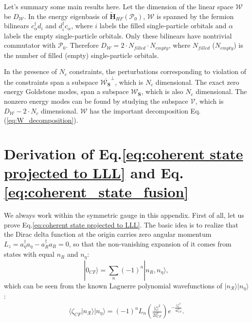 \begin{subappendices}
    Let's summary some main results here. Let the dimension of the linear space $\boldsymbol{\mathcal W}$ be $D_{\boldsymbol{\mathcal W}}$. In the energy eigenbasis of $\tilde {\mathbf H}_{HF}(\boldsymbol{\mathcal P}_0)$, $\boldsymbol{\mathcal W}$ is spanned by the fermion bilinears $c_{\alpha}^{\dagger} d_{i}$ and $d_{i}^{\dagger} c_{\alpha}$, where $i$ labels the filled single-particle orbitals and $\alpha$ labels the empty single-particle orbitals. Only these bilinears have nontrivial commutator with $\boldsymbol{\mathcal P}_0$. Therefore $D_{\boldsymbol{\mathcal W}}=2\cdot N_{filled}\cdot N_{empty}$, where $N_{filled}$ ($N_{empty}$) is the number of filled (empty) single-particle orbitals.

    In the presence of $N_c$ constraints, the perturbations corresponding to violation of the constraints span a subspace $\overline{\boldsymbol{\mathcal W}_{\mathbf S}}^\perp$, which is $N_c$ dimensional. The exact zero energy Goldstone modes, span a subspace $\boldsymbol{\mathcal W}_{\mathbf S}$, which is also $N_c$ dimensional. The nonzero energy modes can be found by studying the subspace $\boldsymbol {\mathcal V}$, which is $D_{\boldsymbol{\mathcal W}}-2\cdot N_c$ dimensional. $\boldsymbol{\mathcal W}$ has the important decomposition Eq.(\ref{eq:W_decomposition}).


    \section{Derivation of Eq.\eqref{eq:coherent state projected to LLL} and Eq.\eqref{eq:coherent_state_fusion}}\label{app:coherent_state_fusion}
    We always work within the symmetric gauge in this appendix. First of all, let us prove Eq.\eqref{eq:coherent state projected to LLL}. The basic idea is to realize that the Dirac delta function at the origin carries zero angular momentum $L_z=a_\eta^\dagger a_\eta - a_R^\dagger a_R=0$, so that the non-vanishing expansion of it comes from states with equal $n_R$ and $n_\eta$:
    \begin{equation}
        |0_{CF}\rangle=\sum_n (-1)^n|n_R,n_\eta\rangle,
    \end{equation}
    which can be seen from the known Laguerre polynomial wavefunctions of $| n_{\mathcal R}\rangle|n_{\eta}\rangle$:
    \begin{align}\label{eq:coherent state Laguerre polynomials}
        \langle\zeta_{CF}| n_{\mathcal R}\rangle|n_{\eta}\rangle=(-1)^nL_n\left(\frac{|\zeta|^2}{2l_{CF}^2}\right) e^{-\frac{|\zeta|^2}{4l_{CF}^2}}.
    \end{align}


\end{subappendices}
